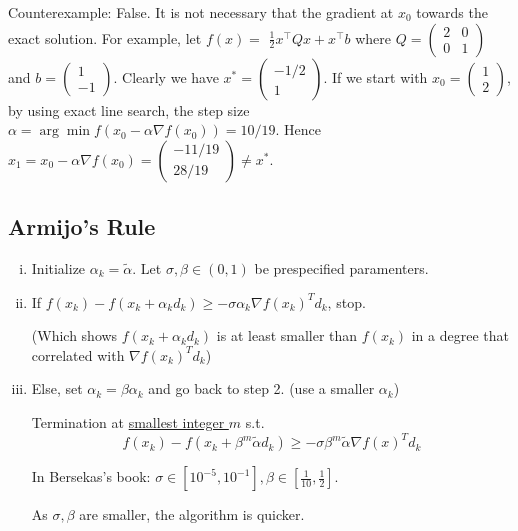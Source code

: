 \documentclass[11pt]{elegantbook}
\begin{document}
Counterexample: False. It is not necessary that the gradient at $x_{0}$ towards the exact solution. For example, let $f(x)=$ $\frac{1}{2} x^{\top} Q x+x^{\top} b$ where $Q=\left(\begin{array}{ll}2 & 0 \\ 0 & 1\end{array}\right)$ and $b=\left(\begin{array}{c}1 \\ -1\end{array}\right)$. Clearly we have $x^{*}=\left(\begin{array}{c}-1 / 2 \\ 1\end{array}\right)$. If we start with $x_{0}=\left(\begin{array}{l}1 \\ 2\end{array}\right)$, by using exact line search, the step size $\alpha=\arg \min f\left(x_{0}-\alpha \nabla f\left(x_{0}\right)\right)=10 / 19$. Hence $x_{1}=x_{0}-\alpha \nabla f\left(x_{0}\right)=\left(\begin{array}{c}-11 / 19 \\ 28 / 19\end{array}\right) \neq x^{*}$.

\subsection{Armijo's Rule}
\begin{enumerate}[(i)]
    \item Initialize $\alpha_k=\tilde{\alpha}$. Let $\sigma,\beta \in (0,1)$ be prespecified paramenters.
    \item If $f(x_k)-f(x_k+\alpha_k d_k)\geq-\sigma \alpha_k \nabla f(x_k)^T d_k$, stop.
    
    (Which shows $f(x_k+\alpha_k d_k)$ is at least smaller than $f(x_k)$ in a degree that correlated with $\nabla f(x_k)^T d_k$)
    \item Else, set $\alpha_k=\beta\alpha_k$ and go back to step 2. (use a smaller $\alpha_k$)
    
    Termination at \underline{smallest integer $m$} s.t. $$f(x_k)-f(x_k+\beta^m \tilde{\alpha} d_k)\geq-\sigma\beta^m \tilde{\alpha}\nabla f(x)^T d_k$$

    In Bersekas's book: $\sigma\in[10^{-5},10^{-1}],\beta\in[\frac{1}{10},\frac{1}{2}]$.

    As $\sigma,\beta$ are smaller, the algorithm is quicker.
\end{enumerate}
\end{document}
